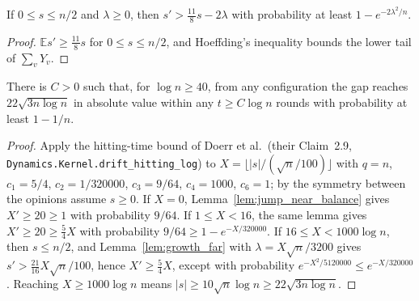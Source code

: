 \begin{lemma}\label{lem:growth_far}
  \leanok
  If $0 \le s \le n/2$ and $\lambda \ge 0$, then $s' > \frac{11}{8}s - 2\lambda$ with
  probability at least $1 - e^{-2\lambda^2/n}$.
\end{lemma}
\begin{proof}
  \leanok
  $\mathbb{E}s' \ge \frac{11}{8}s$ for $0 \le s \le n/2$, and Hoeffding's inequality bounds the
  lower tail of $\sum_v Y_v$.
\end{proof}

\begin{theorem}\label{thm:symmetry_breaking}
  \leanok
  There is $C > 0$ such that, for $\log n \ge 40$, from any configuration the gap reaches
  $22\sqrt{3n\log n}$ in absolute value within any $t \ge C\log n$ rounds with probability at
  least $1 - 1/n$.
\end{theorem}
\begin{proof}
  \leanok
  Apply the hitting-time bound of Doerr et al.\ (their Claim~2.9,
  \texttt{Dynamics.Kernel.drift\_hitting\_log}) to $X = \lfloor |s|/(\sqrt n/100)\rfloor$ with
  $q = n$, $c_1 = 5/4$, $c_2 = 1/320000$, $c_3 = 9/64$, $c_4 = 1000$, $c_6 = 1$; by the
  symmetry between the opinions assume $s \ge 0$. If $X = 0$, Lemma~\ref{lem:jump_near_balance}
  gives $X' \ge 20 \ge 1$ with probability $9/64$. If $1 \le X < 16$, the same lemma gives
  $X' \ge 20 \ge \frac54 X$ with probability $9/64 \ge 1 - e^{-X/320000}$. If
  $16 \le X < 1000\log n$, then $s \le n/2$, and Lemma~\ref{lem:growth_far} with
  $\lambda = X\sqrt n/3200$ gives $s' > \frac{21}{16}X\sqrt n/100$, hence $X' \ge \frac54 X$,
  except with probability $e^{-X^2/5120000} \le e^{-X/320000}$. Reaching $X \ge 1000\log n$
  means $|s| \ge 10\sqrt n\log n \ge 22\sqrt{3n\log n}$.
\end{proof}

